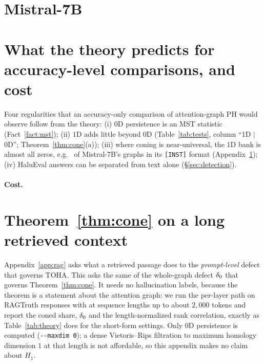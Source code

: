 \section{Mistral-7B}
\label{app:mistral}
\MISTRALAPPENDIX

\section{What the theory predicts for accuracy-level comparisons, and cost}
\label{app:legacy}
Four regularities that an accuracy-only comparison of attention-graph PH would observe follow from the theory: (i) $0$D persistence is an MST statistic (Fact~\ref{fact:mst}); (ii) $1$D adds little beyond $0$D (Table~\ref{tab:tests}, column ``1D $\mid$ 0D''; Theorem~\ref{thm:cone}(a)); (iii) where coning is near-universal, the $1$D bank is almost all zeros, e.g.\ \MistralHOneZero{} of Mistral-7B's graphs in its \texttt{[INST]} format (Appendix~\ref{app:mistral}); (iv) HaluEval answers can be separated from text alone (\S\ref{sec:detection}).

\paragraph{Cost.} \TIMINGPARAGRAPH

\section{Theorem~\ref{thm:cone} on a long retrieved context}
\label{app:long}

Appendix~\ref{app:rag} asks what a retrieved passage does to the \emph{prompt-level} defect that governs TOHA. This asks the same of the whole-graph defect $\delta_0$ that governs Theorem~\ref{thm:cone}. It needs no hallucination labels, because the theorem is a statement about the attention graph: we run the per-layer path on \LongExamples{} RAGTruth responses with \RagModel{} at sequence lengths up to about $2{,}000$ tokens and report the coned share, $\delta_0$ and the length-normalized rank correlation, exactly as Table~\ref{tab:theory} does for the short-form settings. Only $0$D persistence is computed (\texttt{-{}-maxdim 0}); a dense Vietoris--Rips filtration to maximum homology dimension $1$ at that length is not affordable, so this appendix makes no claim about $H_1$.

